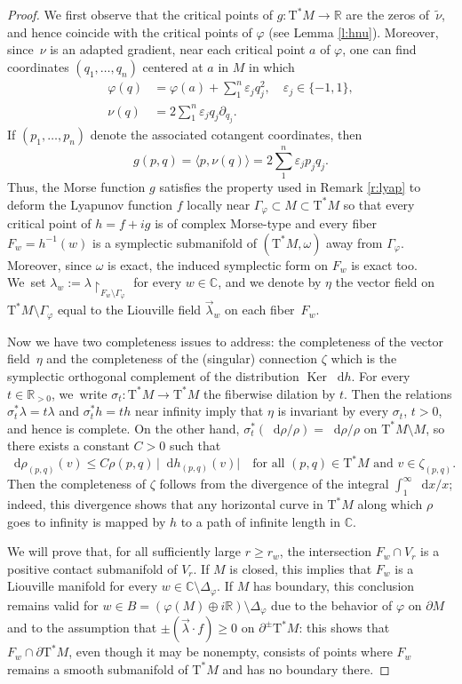 \documentclass[JEP,XML,SOM,Unicode]{cedram}
\let\epsilon\varepsilon
\newcommand{\C}{{\mathbb C}}
\newcommand{\R}{{\mathbb R}}
\newcommand{\Crit}{\Gamma_{\!\varphi}}
\newcommand{\Discr}{\Delta_\varphi}
\newcommand{\Ker}{\operatorname{Ker}}
\newcommand{\etc}{,\ldots,}
\newcommand{\sT}{\mathrm{T}^\ast}
\renewcommand{\d}{\mathop{}\!\mathrm d}
\newcommand{\drho}{\d\rho}
\renewcommand{\dh}{\d h}
\newcommand{\dx}{\d x}
\newcommand{\hnu}{\tilde\nu}
\newcommand{\prg}[1]{\langle #1 \rangle}
\newcommand{\de}{\mathrel{:=}}
\newcommand{\rst}[1]{{\upharpoonright}_{\!#1}}
\let\del\partial
\let\on\colon
\let\sgn\epsilon
\theoremstyle{plain}
\theoremstyle{definition}
\begin{document}
\begin{proof}
We first observe that the critical points of $g \on \sT M \to \R$ are the zeros
of~$\hnu$, and hence coincide with the critical points of $\varphi$ (see Lemma
\ref{l:hnu}). Moreover, since~$\nu$ is an adapted gradient, near each critical
point $a$ of $\varphi$, one can find coordinates $(q_1 \etc q_n)$ centered at
$a$ in $M$ in which
\begin{align*}
	\varphi(q) &= \varphi(a) + \sum_1^n \sgn_j q_j^2, \quad \sgn_j \in \{-1,1\},
	\\ \tag*{and}
	\nu(q) &= 2 \sum_1^n \sgn_j q_j \del_{q_j}.
\end{align*}
If $(p_1 \etc p_n)$ denote the associated cotangent coordinates, then
\[
g(p,q) = \prg{p, \nu(q)} = 2 \sum_1^n \sgn_j p_jq_j.
\]
Thus, the Morse function $g$ satisfies the property used in Remark \ref{r:lyap}
to deform the Lyapunov function $f$ locally near $\Crit \subset M \subset \sT M$
so that every critical point of $h = f+ig$ is of complex Morse-type and every
fiber $F_w = h^{-1}(w)$ is a symplectic submanifold of $(\sT M, \omega)$ away
from $\Crit$. Moreover, since $\omega$ is exact, the induced symplectic form on
$F_w$ is exact too. We~set $\lambda_w \de \lambda \rst{ F_w\setminus \Crit }$ for every
$w \in \C$, and we denote by $\eta$ the vector field on $\sT M\setminus \Crit$ equal to
the Liouville field $\vec\lambda_w$ on each fiber~$F_w$.

Now we have two completeness issues to address: the completeness of the vector
field~$\eta$ and the completeness of the (singular) connection $\zeta$ which is
the symplectic orthogonal complement of the distribution $\Ker \dh$. For every
$t \in \R_{>0}$, we~write $\sigma_t \on \sT M \to \sT M$ the fiberwise dilation
by $t$. Then the relations $\sigma_t^*\lambda = t\lambda$ and $\sigma_t^*h = th$
near infinity imply that $\eta$ is invariant by every $\sigma_t$, $t>0$, and
hence is complete. On the other hand, $\sigma_t^*(\drho/\rho) = \drho/\rho$ on
$\sT M \setminus M$, so there exists a constant $C>0$ such that
\[
\drho_{(p,q)} (v) \le C \rho(p,q) \, \bigl|\dh_{(p,q)}(v)\bigr| \quad
	\text{for all $(p,q) \in \sT M$ and $v \in \zeta_{(p,q)}$.}
\]
Then the completeness of $\zeta$ follows from the divergence of the integral
$\int_1^\infty \dx / x$; indeed, this divergence shows that any horizontal curve
in $\sT M$ along which $\rho$ goes to infinity is mapped by $h$ to a path of
infinite length in $\C$.

We will prove that, for all sufficiently large $r \ge r_w$, the intersection
$F_w \cap V_r$ is a positive contact submanifold of $V_r$. If $M$ is closed,
this implies that $F_w$ is a Liouville manifold for every $w \in \C \setminus \Discr$.
If $M$ has boundary, this conclusion remains valid for $w \in B = (\varphi(M)
\oplus i\R) \setminus \Discr$ due to the behavior of $\varphi$ on $\del M$ and to the
assumption that $\pm (\vec\lambda \cdot f) \ge 0$ on $\del^\pm \sT M$: this
shows that $F_w \cap \del\sT M$, even though it may be nonempty, consists of
points where $F_w$ remains a smooth submanifold of $\sT M$ and has no boundary
there.


\end{proof}
\end{document}
